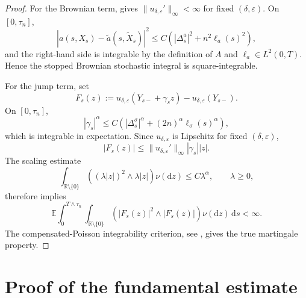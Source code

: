\documentclass[10pt,a4paper]{amsart}
\newcommand{\R}{\mathbb{R}}
\newcommand{\E}{\mathbb{E}}
\newcommand{\1}{\mathbf{1}}
\newcommand{\dd}{\,\mathrm{d}}
\newcommand{\md}{\mathrm{d}}
\newcommand{\wt}{\tilde}
\newcommand{\eps}{\varepsilon}
\begin{document}
\begin{proof}
For the Brownian term,  gives $\|u_{\delta,\eps}'\|_\infty<\infty$ for fixed $(\delta,\eps)$. On $[0,\tau_n]$,
\[
|a(s,X_s)-\wt a(s,\wt X_s)|^2
\le C\left(|\Delta_s^a|^2+n^2\ell_a(s)^2\right),
\]
and the right-hand side is integrable by the definition of $A$ and $\ell_a\in L^2(0,T)$. Hence the stopped Brownian stochastic integral is square-integrable.

For the jump term, set
\[
  F_s(z):=u_{\delta,\eps}(Y_{s-}+\gamma_s z)-u_{\delta,\eps}(Y_{s-}).
\]
On $[0,\tau_n]$,
\[
  |\gamma_s|^\alpha
  \le C\left(|\Delta_s^\sigma|^\alpha+(2n)^\alpha \ell_\sigma(s)^\alpha\right),
\]
which is integrable in expectation. Since $u_{\delta,\eps}$ is Lipschitz for fixed $(\delta,\eps)$,
\[
|F_s(z)|\le \|u_{\delta,\eps}'\|_\infty |\gamma_s||z|.
\]
The scaling estimate
\[
\int_{\R\setminus\{0\}}
\left((\lambda |z|)^2\wedge \lambda |z|\right)\nu(\md z)
\le C\lambda^\alpha,
\qquad \lambda\ge0,
\]
therefore implies
\[
\E\int_0^{T\wedge\tau_n}\int_{\R\setminus\{0\}}
\left(|F_s(z)|^2\wedge |F_s(z)|\right)\nu(\md z)\dd s<\infty.
\]
The compensated-Poisson integrability criterion, see \cite[Ch.~II]{IkedaWatanabe1989}, gives the true martingale property.
\end{proof}


\section{Proof of the fundamental estimate}
\label{sec:proof-fundamental}
\end{document}
